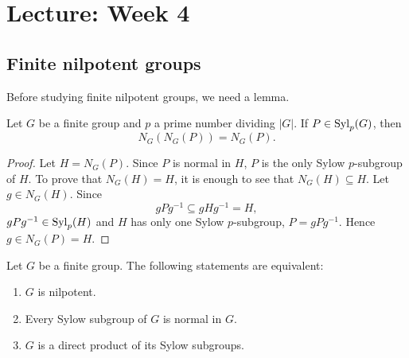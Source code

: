 \section{Lecture: Week 4}


\subsection{Finite nilpotent groups}

Before studying finite nilpotent groups, we need a lemma. 

\begin{lemma}
\label{lem:normalizador}
Let $G$ be a finite group and $p$ a prime number dividing $|G|$. 
If 
$P\in\mathrm{Syl}_p(G)$, then 
\[
N_G(N_G(P))=N_G(P). 
\]
\end{lemma}

\begin{proof}
Let $H=N_G(P)$. Since $P$ is normal in $H$, $P$ is the only Sylow $p$-subgroup of $H$. 
To prove that $N_G(H)=H$, it is enough to see that $N_G(H)\subseteq
H$. Let $g\in N_G(H)$. Since  
\[
gPg^{-1}\subseteq gHg^{-1}=H,
\]
$gPg^{-1}\in\mathrm{Syl}_p(H)$ and $H$ has only one Sylow $p$-subgroup, 
$P=gPg^{-1}$.  Hence $g\in N_G(P)=H$. 
\end{proof}

\begin{theorem}
\label{thm:nilpotent:eq}
Let $G$ be a finite group. The following statements are equivalent:
\begin{enumerate}
	\item $G$ is nilpotent. 
	\item Every Sylow subgroup of $G$ is normal in $G$. 
	\item $G$ is a direct product of its Sylow subgroups. 
\end{enumerate}
\end{theorem}


